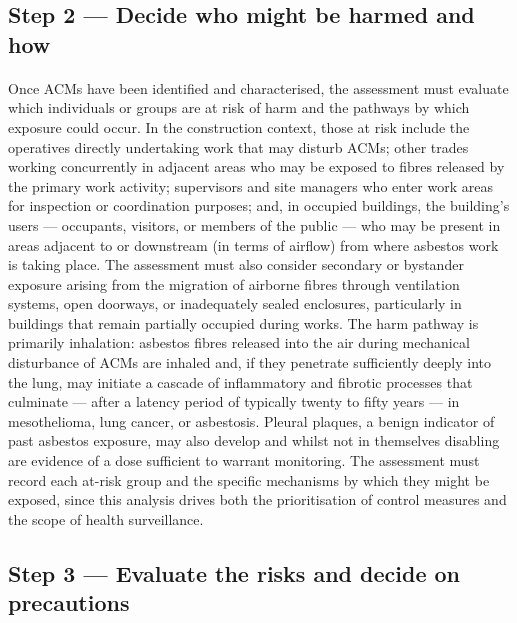 \subsection{Step 2 — Decide who might be harmed and how}

\paragraph{}
Once ACMs have been identified and characterised, the assessment must evaluate which individuals or groups are at risk of harm and the pathways by which exposure could occur. In the construction context, those at risk include the operatives directly undertaking work that may disturb ACMs; other trades working concurrently in adjacent areas who may be exposed to fibres released by the primary work activity; supervisors and site managers who enter work areas for inspection or coordination purposes; and, in occupied buildings, the building's users — occupants, visitors, or members of the public — who may be present in areas adjacent to or downstream (in terms of airflow) from where asbestos work is taking place. The assessment must also consider secondary or bystander exposure arising from the migration of airborne fibres through ventilation systems, open doorways, or inadequately sealed enclosures, particularly in buildings that remain partially occupied during works. The harm pathway is primarily inhalation: asbestos fibres released into the air during mechanical disturbance of ACMs are inhaled and, if they penetrate sufficiently deeply into the lung, may initiate a cascade of inflammatory and fibrotic processes that culminate — after a latency period of typically twenty to fifty years — in mesothelioma, lung cancer, or asbestosis. Pleural plaques, a benign indicator of past asbestos exposure, may also develop and whilst not in themselves disabling are evidence of a dose sufficient to warrant monitoring. The assessment must record each at-risk group and the specific mechanisms by which they might be exposed, since this analysis drives both the prioritisation of control measures and the scope of health surveillance.

\subsection{Step 3 — Evaluate the risks and decide on precautions}

